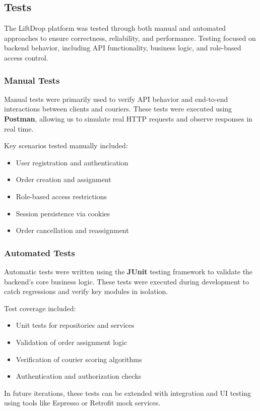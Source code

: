 \subsection{Tests}

The LiftDrop platform was tested through both manual and automated approaches to ensure correctness, reliability, and performance. Testing focused on backend behavior, including API functionality, business logic, and role-based access control.

\subsubsection{Manual Tests}

Manual tests were primarily used to verify API behavior and end-to-end interactions between clients and couriers. These tests were executed using \textbf{Postman}, allowing us to simulate real HTTP requests and observe responses in real time.

Key scenarios tested manually included:
\begin{itemize}
    \item User registration and authentication
    \item Order creation and assignment
    \item Role-based access restrictions
    \item Session persistence via cookies
    \item Order cancellation and reassignment
\end{itemize}

\subsubsection{Automated Tests}

Automatic tests were written using the \textbf{JUnit} testing framework to validate the backend’s core business logic. These tests were executed during development to catch regressions and verify key modules in isolation.

Test coverage included:
\begin{itemize}
    \item Unit tests for repositories and services
    \item Validation of order assignment logic
    \item Verification of courier scoring algorithms
    \item Authentication and authorization checks
\end{itemize}

In future iterations, these tests can be extended with integration and UI testing using tools like Espresso or Retrofit mock services.
